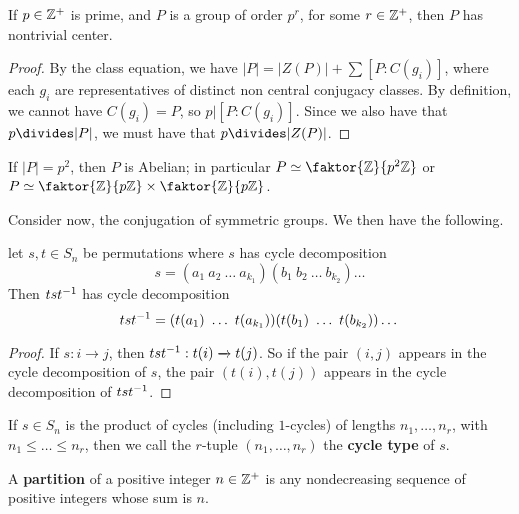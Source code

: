 \begin{theorem}\label{theorem_4.3.3}
  If $p \in \mathbb{Z}^+$ is prime, and $P$ is a group of order $p^r$, for some  $r
  \in \mathbb{Z}^+$, then $P$ has nontrivial center.
\end{theorem}
\begin{proof}
  By the class equation, we have $|P|=|Z(P)|+\sum{[P:C(g_i)]}$, where
  each $g_i$ are representatives of distinct non central conjugacy classes. By
  definition, we cannot have $C(g_i)=P$, so $p|[P:C(g_i)]$. Since we also have
  that $p \divides |P|$, we must have that $p \divides |Z(P)|$.
\end{proof}
\begin{corollary}
  If $|P|=p^2$, then $P$ is Abelian; in particular  $P \simeq
  \faktor{\Z}{p^2\Z}$ or $P \simeq \faktor{\Z}{p\Z} \times \faktor{\Z}{p\Z}$.
\end{corollary}

Consider now, the conjugation of symmetric groups. We then have the following.

\begin{lemma}\label{lemma_4.3.4}
  let $s,t \in S_n$ be permutations where $s$ has cycle decomposition
  \begin{equation*}
    s=(a_1 \ a_2 \ \dots \ a_{k_1})(b_1 \ b_2 \ \dots \ b_{k_2})\dots
  \end{equation*}
  Then $tst^{-1}$ has cycle decomposition
  \begin{equation*}
    ts\inv{t}=(t(a_1) \ \dots \ t(a_{k_1}))(t(b_1) \ \dots \ t(b_{k_2}))\dots
  \end{equation*}
\end{lemma}
\begin{proof}
  If $s:i \xrightarrow{} j$, then $tst^{-1}:t(i) \xrightarrow{} t(j)$. So if
  the pair $(i,j)$ appears in the cycle decomposition of $s$, the pair
  $(t(i),t(j))$ appears in the cycle decomposition of $tst^{-1}$.
\end{proof}

\begin{definition}
  If $s \in S_n$ is the product of cycles (including $1$-cycles) of lengths
  $n_1, \dots, n_r$, with $n_1 \leq \dots \leq n_r$, then we call the $r$-tuple
  $(n_1, \dots, n_r)$ the \textbf{cycle type} of $s$.
\end{definition}

\begin{definition}
  A \textbf{partition} of a positive integer $n \in \mathbb{Z}^+$ is any nondecreasing
  sequence of positive integers whose sum is $n$.
\end{definition}

